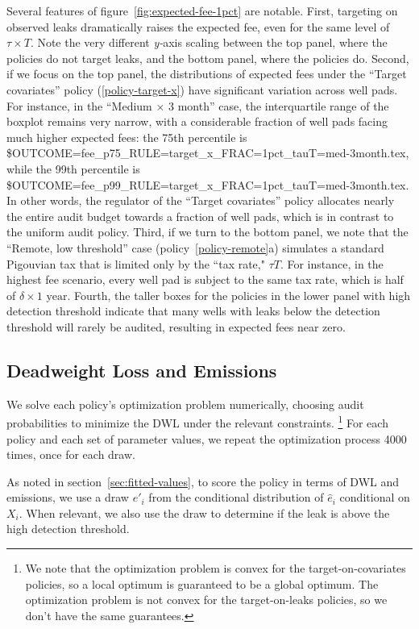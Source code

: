 \documentclass[12pt,oneside,letterpaper]{article}
\theoremstyle{definition}
\begin{document}
\begin{refsection}
Several features of figure~\ref{fig:expected-fee-1pct} are notable.
First, targeting on observed leaks dramatically raises the expected fee, even for the same level of \(\tau \times T\).
Note the very different \textit{y-}axis scaling between the top panel, where the policies do not target leaks, and the bottom panel, where the policies do.
Second, if we focus on the top panel, the distributions of expected fees under the ``Target covariates'' policy (\ref{policy-target-x}) have significant variation across well pads.
For instance, in the ``Medium \(\times\) 3 month'' case, the interquartile range of the boxplot remains very narrow, with a considerable fraction of well pads facing much higher expected fees:
the 75th percentile is
\${OUTCOME=fee_p75_RULE=target_x_FRAC=1pct_tauT=med-3month.tex},
while the 99th percentile is
\${OUTCOME=fee_p99_RULE=target_x_FRAC=1pct_tauT=med-3month.tex}.
In other words, the regulator of the ``Target covariates'' policy allocates nearly the entire audit budget towards a fraction of well pads, which is in contrast to the uniform audit policy.
Third, if we turn to the bottom panel, we note that the ``Remote, low threshold'' case (policy~\ref{policy-remote}a) simulates a standard Pigouvian tax that is limited only by the ``tax rate," \(\tau T\).
For instance, in the highest fee scenario, every well pad is subject to the same tax rate, which is half of \(\delta \times \text{1 year}\).
Fourth, the taller boxes for the policies in the lower panel with high detection threshold indicate that many wells with leaks below the detection threshold will rarely be audited, resulting in expected fees near zero.


\subsection{Deadweight Loss and Emissions}
\label{sec:dwl-and-emissions}


We solve each policy's optimization problem numerically, choosing audit probabilities to minimize the \gls{DWL} under the relevant constraints.%
\footnote{%
We note that the optimization problem is convex for the target-on-covariates policies, so a local optimum is guaranteed to be a global optimum.
The optimization problem is not convex for the target-on-leaks policies, so we don't have the same guarantees.
}
For each policy and each set of parameter values, we repeat the optimization process 4000 times, once for each draw.

As noted in section~\ref{sec:fitted-values}, to score the policy in terms of \gls{DWL} and emissions, we use a draw \(e'_i\) from the conditional distribution of \(\hat{e}_i\) conditional on \(X_i\).
When relevant, we also use the draw to determine if the leak is above the high detection threshold.


\end{refsection}
\end{document}
